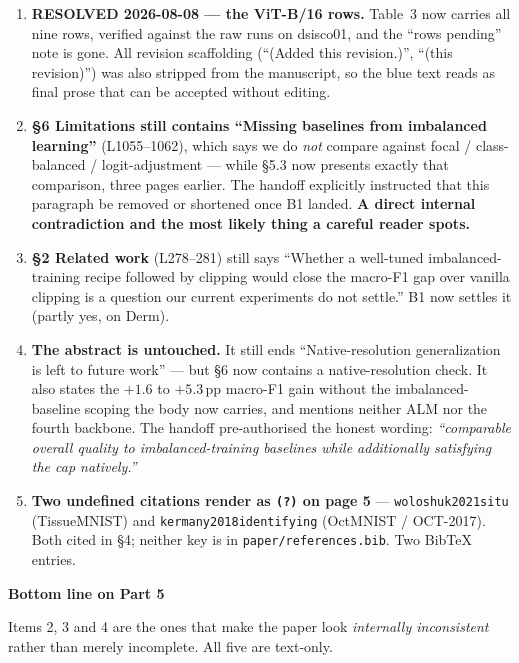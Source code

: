 \documentclass[11pt,a4paper]{article}
\newenvironment{callout}[1]
  {\par\medskip\noindent\begin{lrbox}{\calloutbox}%
   \begin{minipage}{\dimexpr\linewidth-20pt\relax}%
   \textbf{#1}\par\smallskip}
  {\end{minipage}\end{lrbox}%
   \setlength{\fboxsep}{10pt}%
   \colorbox{boxgrey}{\usebox{\calloutbox}}\par\medskip}
\begin{document}
\begin{enumerate}
\item[\textcolor{okgreen}{\checkmark}] \textbf{\textcolor{okgreen}{RESOLVED 2026-08-08 --- the
      ViT-B/16 rows.}} Table~3 now carries all nine rows, verified against the raw runs on
      dsisco01, and the ``rows pending'' note is gone. All revision scaffolding
      (``(Added this revision.)'', ``(this revision)'') was also stripped from the manuscript, so
      the blue text reads as final prose that can be accepted without editing.

\item \textbf{\S6 Limitations still contains ``Missing baselines from imbalanced learning''}
      (L1055--1062), which says we do \emph{not} compare against focal / class-balanced /
      logit-adjustment --- while \S5.3 now presents exactly that comparison, three pages earlier.
      The handoff explicitly instructed that this paragraph be removed or shortened once B1 landed.
      \textcolor{warnred}{\textbf{A direct internal contradiction and the most likely thing a
      careful reader spots.}}

\item \textbf{\S2 Related work} (L278--281) still says ``Whether a well-tuned imbalanced-training
      recipe followed by clipping would close the macro-F1 gap over vanilla clipping is a question
      our current experiments do not settle.'' B1 now settles it (partly yes, on Derm).

\item \textbf{The abstract is untouched.} It still ends ``Native-resolution generalization is left
      to future work'' --- but \S6 now contains a native-resolution check. It also states the
      $+1.6$ to $+5.3$\,pp macro-F1 gain without the imbalanced-baseline scoping the body now
      carries, and mentions neither ALM nor the fourth backbone. The handoff pre-authorised the
      honest wording: \emph{``comparable overall quality to imbalanced-training baselines while
      additionally satisfying the cap natively.''}

\item \textbf{Two undefined citations render as \texttt{(?)} on page 5} ---
      \texttt{woloshuk2021situ} (TissueMNIST) and \texttt{kermany2018identifying} (OctMNIST /
      OCT-2017). Both cited in \S4; neither key is in \texttt{paper/references.bib}. Two BibTeX
      entries.
\end{enumerate}

\begin{callout}{Bottom line on Part 5}
Items 2, 3 and 4 are the ones that make the paper look \emph{internally inconsistent} rather than
merely incomplete. All five are text-only.
\end{callout}
\end{document}
